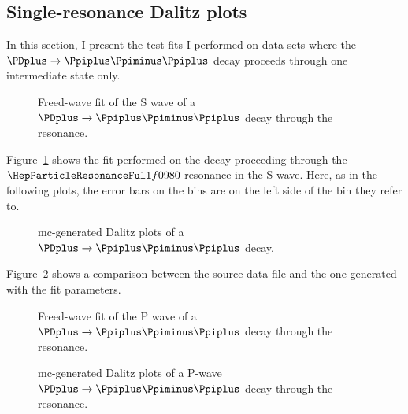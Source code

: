 \subsection{Single-resonance Dalitz plots}

    In this section, I present the test fits I performed on data sets where the $\PDplus\to\Ppiplus\Ppiminus\Ppiplus$ decay proceeds through one intermediate state only. 

    \begin{figure}
        \centering
        \subfloat[][\label{fig:f0_only_phase_fit}]{}

        \subfloat[][]{}
        \caption{Freed-wave fit of the S wave of a $\PDplus \to \Ppiplus\Ppiminus\Ppiplus$ decay through the \Pfnez{} resonance.} 
        \label{fig:f0_only}
    \end{figure}
    Figure~\ref{fig:f0_only} shows the fit performed on the decay proceeding through the $\Pfnez$ resonance in the S wave.
    Here, as in the following plots, the error bars on the bins are on the left side of the bin they refer to.
    \begin{figure}
        \centering

        \caption{\ac{mc}-generated Dalitz plots of a $\PDplus \to \Ppiplus\Ppiminus\Ppiplus$ decay.}
        \label{fig:f0_only_dalitz}
    \end{figure}
    Figure~\ref{fig:f0_only_dalitz} shows a comparison between the source data file and the one generated with the fit parameters.

    \begin{figure}
        \centering

        \subfloat[][]{}

        \subfloat[][]{}


        \caption{Freed-wave fit of the P wave of a $\PDplus \to \Ppiplus\Ppiminus\Ppiplus$ decay through the \Prhozero{} resonance.}
    \end{figure}

    \begin{figure}
        \centering


        \caption{\ac{mc}-generated Dalitz plots of a P-wave $\PDplus \to \Ppiplus\Ppiminus\Ppiplus$ decay through the \Prhozero{} resonance.}

    \end{figure}


